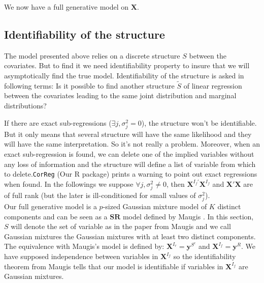 \documentclass[12pt,a4paper]{report}
\begin{document}
	We now have a full generative model on $\boldsymbol{X}$.
	
\subsection{Identifiability of the structure} \label{preuveident}
	The model presented above relies on a discrete structure $S$ between the covariates. But to find it we need identifiability property to insure that we will asymptotically find the true model. Identifiability of the structure is asked in following terms: Is it possible to find another structure $\tilde{S}$ of linear regression between the covariates leading to the same joint distribution and marginal distributions? 
	
		If there are exact sub-regressions ($\exists j, \sigma^2_j=0$), the structure won't be identifiable. But it only means that several structure will have the same likelihood and they will have the same interpretation. So it's not really a problem. Moreover, when an exact sub-regression is found, we can delete one of the implied variables without any loss of information and the structure will define a list of variable from which to delete.{\tt CorReg} (Our R package) prints a warning to point out exact regressions when found.
	In the followings we suppose $\forall j, \sigma^2_j\neq 0$, then $\boldsymbol{X}^{I_f'}\boldsymbol{X}^{I_f}$ and $\boldsymbol{X}'\boldsymbol{X}$ are of full rank (but the later is ill-conditioned for small values of $\sigma^2_j$).
	\\
	
Our full generative model is a $p$-sized Gaussian mixture model of $K$ distinct components and 
%	
	can be seen as a $\mathbf{SR}$ model defined by Maugis \cite{maugis2009variable}. In this section, $S$ will denote the set of variable as in the paper from Maugis and we call Gaussian mixtures the Gaussian mixtures with at least two distinct components. The equivalence with Maugis's model is defined by:
	$\boldsymbol{X}^{I_r}=\boldsymbol{y}^{S^c}$ and $\boldsymbol{X}^{I_f}=\boldsymbol{y}^R$. We have supposed independence between variables in $\boldsymbol{X}^{I_f}$ so the identifiability theorem from Maugis tells that our model is identifiable if variables in $\boldsymbol{X}^{I_f}$ are Gaussian mixtures.%
	\\
	
\end{document}
